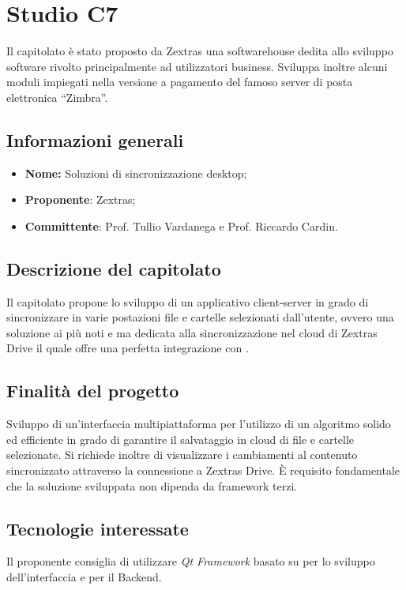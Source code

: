 \section{Studio C7} \label{_c7}

Il capitolato è stato proposto da Zextras una softwarehouse dedita allo sviluppo software rivolto principalmente ad utilizzatori business.
Sviluppa inoltre alcuni moduli impiegati nella versione a pagamento del famoso server di posta elettronica “Zimbra”.

\subsection{Informazioni generali}
\begin{itemize}
	\item \textbf{Nome:} Soluzioni di sincronizzazione desktop;
	\item \textbf{Proponente}: Zextras;
	\item \textbf{Committente}: Prof. Tullio Vardanega e Prof. Riccardo Cardin.
\end{itemize}

\subsection{Descrizione del capitolato}
Il capitolato propone lo sviluppo di un applicativo client-server in grado di sincronizzare in varie postazioni file e cartelle selezionati dall’utente, ovvero una soluzione ai più noti \textit{} e \textit{} ma dedicata alla sincronizzazione nel cloud di Zextras Drive il quale offre una perfetta integrazione con \textit{}.

\subsection{Finalità del progetto}
Sviluppo di un’interfaccia multipiattaforma per l’utilizzo di un algoritmo solido ed efficiente in grado di garantire il salvataggio in cloud di file e cartelle selezionate.
Si richiede inoltre di visualizzare i cambiamenti al contenuto sincronizzato attraverso la connessione a Zextras Drive. È requisito fondamentale che la soluzione sviluppata non dipenda da framework terzi.


\subsection{Tecnologie interessate}
Il proponente consiglia di utilizzare \textit{Qt Framework} basato su  per lo sviluppo dell’interfaccia e \textit{} per il Backend.

